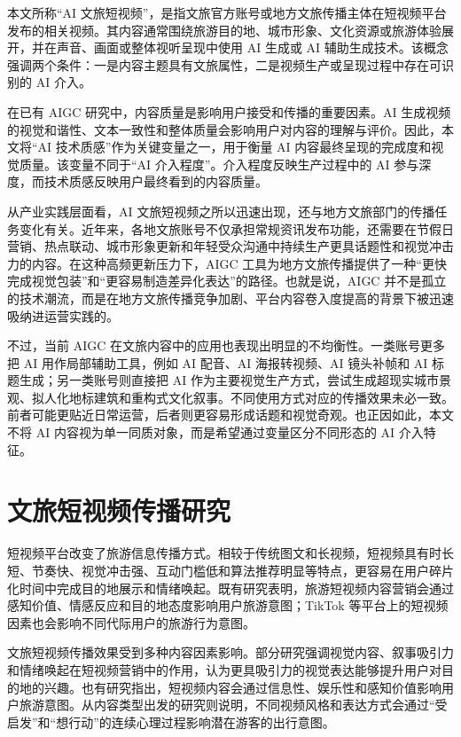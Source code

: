 本文所称“AI 文旅短视频”，是指文旅官方账号或地方文旅传播主体在短视频平台发布的相关视频。其内容通常围绕旅游目的地、城市形象、文化资源或旅游体验展开，并在声音、画面或整体视听呈现中使用 AI 生成或 AI 辅助生成技术。该概念强调两个条件：一是内容主题具有文旅属性，二是视频生产或呈现过程中存在可识别的 AI 介入。

在已有 AIGC 研究中，内容质量是影响用户接受和传播的重要因素。AI 生成视频的视觉和谐性、文本一致性和整体质量会影响用户对内容的理解与评价\cite{lit03}。因此，本文将“AI 技术质感”作为关键变量之一，用于衡量 AI 内容最终呈现的完成度和视觉质量。该变量不同于“AI 介入程度”。介入程度反映生产过程中的 AI 参与深度，而技术质感反映用户最终看到的内容质量。

从产业实践层面看，AI 文旅短视频之所以迅速出现，还与地方文旅部门的传播任务变化有关。近年来，各地文旅账号不仅承担常规资讯发布功能，还需要在节假日营销、热点联动、城市形象更新和年轻受众沟通中持续生产更具话题性和视觉冲击力的内容。在这种高频更新压力下，AIGC 工具为地方文旅传播提供了一种“更快完成视觉包装”和“更容易制造差异化表达”的路径。也就是说，AIGC 并不是孤立的技术潮流，而是在地方文旅传播竞争加剧、平台内容卷入度提高的背景下被迅速吸纳进运营实践的。

不过，当前 AIGC 在文旅内容中的应用也表现出明显的不均衡性。一类账号更多把 AI 用作局部辅助工具，例如 AI 配音、AI 海报转视频、AI 镜头补帧和 AI 标题生成；另一类账号则直接把 AI 作为主要视觉生产方式，尝试生成超现实城市景观、拟人化地标建筑和重构式文化叙事。不同使用方式对应的传播效果未必一致。前者可能更贴近日常运营，后者则更容易形成话题和视觉奇观。也正因如此，本文不将 AI 内容视为单一同质对象，而是希望通过变量区分不同形态的 AI 介入特征。

\section{文旅短视频传播研究}

短视频平台改变了旅游信息传播方式。相较于传统图文和长视频，短视频具有时长短、节奏快、视觉冲击强、互动门槛低和算法推荐明显等特点，更容易在用户碎片化时间中完成目的地展示和情绪唤起。既有研究表明，旅游短视频内容营销会通过感知价值、情感反应和目的地态度影响用户旅游意图\cite{lit04}；TikTok 等平台上的短视频因素也会影响不同代际用户的旅游行为意图\cite{lit05}。

文旅短视频传播效果受到多种内容因素影响。部分研究强调视觉内容、叙事吸引力和情绪唤起在短视频营销中的作用，认为更具吸引力的视觉表达能够提升用户对目的地的兴趣\cite{lit06}。也有研究指出，短视频内容会通过信息性、娱乐性和感知价值影响用户旅游意图\cite{lit07}。从内容类型出发的研究则说明，不同视频风格和表达方式会通过“受启发”和“想行动”的连续心理过程影响潜在游客的出行意图\cite{lit22}。

